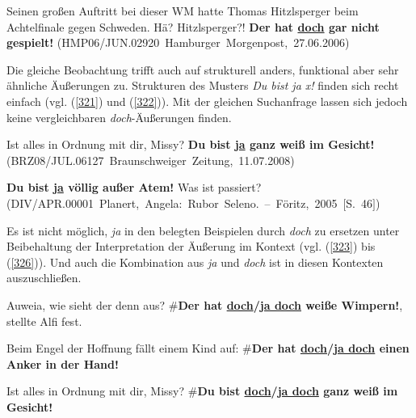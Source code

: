 \begin{exe}
	\ex\label{320}
	\scriptsize 
	Seinen großen Auftritt bei dieser WM hatte Thomas Hitzlsperger beim Achtelfinale gegen Schweden. Hä? Hitzlsperger?! \textbf{Der hat \underline{doch} 		gar nicht gespielt!}     
	\newline
	\hbox{}\hfill\hbox{(HMP06/JUN.02920 Hamburger Morgenpost, 27.06.2006)}	
\end{exe}						   
Die gleiche Beobachtung trifft auch auf strukturell anders, funktional aber sehr ähnliche Äußerungen zu. Strukturen des Musters \textit{Du bist ja x!} finden sich recht einfach (vgl. (\ref{321}) und (\ref{322})). Mit der gleichen Suchanfrage lassen sich jedoch keine vergleichbaren \textit{doch}-Äußerungen finden.

\begin{exe}
	\ex\label{321}
	\scriptsize 
	 \glqq Ist alles in Ordnung mit dir, Missy? \textbf{Du bist \underline{ja} ganz weiß im Gesicht!}\grqq{}    
	\newline
	\hbox{}\hfill\hbox{(BRZ08/JUL.06127 Braunschweiger Zeitung, 11.07.2008)}	
\end{exe}
\vspace{-0.65cm}
\begin{exe}
	\ex\label{322}
	\scriptsize 
	 \glqq \textbf{Du bist \underline{ja} völlig außer Atem!} Was ist passiert?\grqq{}    
	\newline
	\hbox{}\hfill\hbox{(DIV/APR.00001 Planert, Angela: Rubor Seleno. – Föritz, 2005 $[$S. 46$]$)}	
\end{exe}	 
Es ist nicht möglich, \textit{ja} in den belegten Beispielen durch \textit{doch} zu ersetzen unter Beibehaltung der Interpretation der Äußerung im Kontext (vgl. (\ref{323}) bis (\ref{326})). Und auch die Kombination aus \textit{ja} und \textit{doch} ist in diesen Kontexten auszuschließen.

\begin{exe}
	\ex\label{323}
	\glqq Auweia, wie sieht der denn aus? \#\textbf{Der hat \underline{doch}/\underline{ja doch} weiße Wimpern!}\grqq{}, stellte Alfi fest.
\end{exe}	

\begin{exe}
	\ex\label{324}
	Beim Engel der Hoffnung fällt einem Kind auf: \glqq \#\textbf{Der hat \underline{doch}/\underline{ja doch} einen Anker in der Hand!}\grqq{}
\end{exe}	

\begin{exe}
	\ex\label{325}
	\glqq Ist alles in Ordnung mit dir, Missy? \#\textbf{Du bist \underline{doch}/\underline{ja doch} ganz weiß im Gesicht!}\grqq{}
\end{exe}

